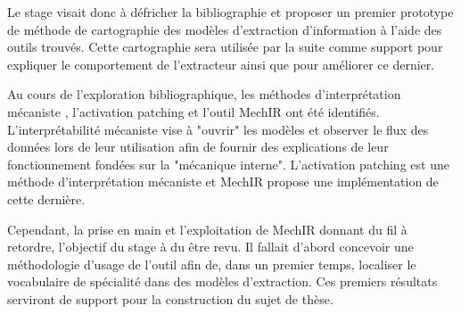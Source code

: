     Le stage visait donc à défricher la bibliographie et proposer un premier prototype de méthode de cartographie des modèles d'extraction d'information à l'aide des outils trouvés. Cette cartographie sera utilisée par la suite comme support pour expliquer le comportement de l'extracteur ainsi que pour améliorer ce dernier.

    Au cours de l'exploration bibliographique, les méthodes d'interprétation mécaniste \cite{somvanshi_bridging_2026}, l'activation patching \cite{chen_axiomatic_2024} et l'outil MechIR \cite{parry_mechir_2025} ont été identifiés. L'interprétabilité mécaniste vise à "ouvrir" les modèles et observer le flux des données lors de leur utilisation afin de fournir des explications de leur fonctionnement fondées sur la "mécanique interne". L'activation patching est une méthode d'interprétation mécaniste et MechIR propose une implémentation de cette dernière.
    
    Cependant, la prise en main et l'exploitation de MechIR donnant du fil à retordre, l'objectif du stage à du être revu. Il fallait d'abord concevoir une méthodologie d'usage de l'outil afin de, dans un premier temps, localiser le vocabulaire de spécialité dans des modèles d'extraction. Ces premiers résultats serviront de support pour la construction du sujet de thèse.

    
